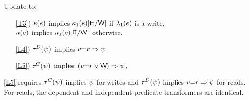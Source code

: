 \begin{definition}[\xRRD]
  \label{def:pomsets-rr}
  Update  to:
  \begin{enumerate}
  \item[\ref{T3})]
    $\kappa(e)$ implies
    $\kappa_1(e)[\mathsf{tt}/\mathsf{W}]$ if $\lambda_1(e)$ is a write,
    \\
    $\kappa(e)$ implies
    $\kappa_1(e)[\mkern.6mu\mathsf{ff}\mkern.6mu/\mathsf{W}]$ otherwise.
  \end{enumerate}
  \begin{enumerate}
  \item[\ref{L4})]
    $\aTr{\bEvs}{\bForm}$ implies $v{=}r\Rightarrow\psi$, 
  \item[\ref{L5})]
    $\aTr{\cEvs}{\bForm}$ implies $(v{=}r\lor\mathsf{W})\Rightarrow\psi$,
  \end{enumerate}  
\end{definition}
\ref{L5} requires $\aTr{\cEvs}{\bForm}$ implies $\psi$ for writes and
$\aTr{\bEvs}{\bForm}$ implies $v{=}r\Rightarrow\psi$ for reads.  For
reads, the dependent and independent predicate transformers are identical.

